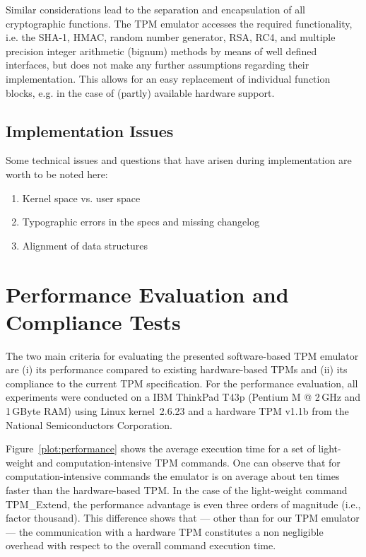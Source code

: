 \documentclass[runningheads]{llncs}
\begin{document}
Similar considerations lead to the separation and encapsulation of all
cryptographic functions. The TPM emulator accesses the required functionality,
i.e. the SHA-1, HMAC, random number generator, RSA, RC4, and multiple
precision integer arithmetic (bignum) methods by means of well defined
interfaces, but does not make any further assumptions regarding their
implementation. This allows for an easy replacement of individual function
blocks, e.g. in the case of (partly) available hardware support.

\subsection{Implementation Issues}
Some technical issues and questions that have arisen during implementation
are worth to be noted here:
\begin{enumerate}
	\item Kernel space vs. user space
	\item Typographic errors in the specs and missing changelog
	\item Alignment of data structures
\end{enumerate}



\section{Performance Evaluation and Compliance Tests}\label{sec:state}
The two main criteria for evaluating the presented software-based TPM
emulator are (i) its performance compared to existing hardware-based TPMs and
(ii) its compliance to the current TPM specification. For the performance
evaluation, all experiments were conducted on a IBM ThinkPad T43p (Pentium M @
2\,GHz and 1\,GByte RAM) using Linux kernel~2.6.23 and a hardware TPM v1.1b
from the National Semiconductors Corporation.

Figure~\ref{plot:performance} shows the average execution time for a set of
light-weight and computation-intensive TPM commands. One can observe that for
computation-intensive commands the emulator is on average about ten times
faster than the hardware-based TPM. In the case of the light-weight command
\textsf{TPM\_Extend}, the performance advantage is even three orders of
magnitude (i.e., factor thousand). This difference shows that --- other than
for our TPM emulator --- the communication with a hardware TPM constitutes a
non negligible overhead with respect to the overall command execution time.
\end{document}
